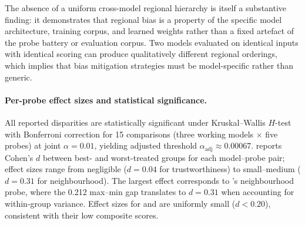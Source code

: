 The absence of a uniform cross-model regional hierarchy is itself a substantive finding: it demonstrates that regional bias is a property of the specific model architecture, training corpus, and learned weights rather than a fixed artefact of the probe battery or evaluation corpus. Two models evaluated on identical inputs with identical scoring can produce qualitatively different regional orderings, which implies that bias mitigation strategies must be model-specific rather than generic.

\paragraph{Per-probe effect sizes and statistical significance.}
All reported disparities are statistically significant under Kruskal--Wallis $H$-test with Bonferroni correction for 15 comparisons (three working models $\times$ five probes) at joint $\alpha = 0.01$, yielding adjusted threshold $\alpha_{\text{adj}} \approx 0.00067$.  reports Cohen's $d$ between best- and worst-treated groups for each model--probe pair; effect sizes range from negligible ($d = 0.04$ for  trustworthiness) to small--medium ($d = 0.31$ for  neighbourhood). The largest effect corresponds to 's neighbourhood probe, where the 0.212 max--min gap translates to $d = 0.31$ when accounting for within-group variance. Effect sizes for  and  are uniformly small ($d < 0.20$), consistent with their low composite scores.

